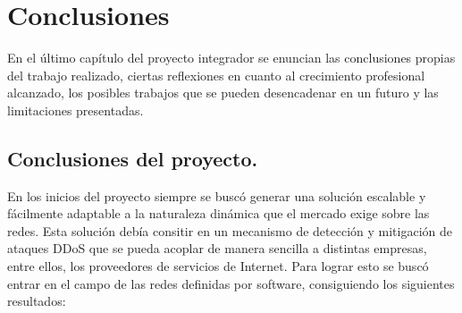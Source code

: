 \chapter{Conclusiones} %

\label{sec:Conclusiones} %

En el último capítulo del proyecto integrador se enuncian las conclusiones propias del trabajo realizado, ciertas reflexiones en cuanto al crecimiento profesional alcanzado, los posibles trabajos que se pueden desencadenar en un futuro y las limitaciones presentadas.


\section{Conclusiones del proyecto.} \label{sec:conclusionesproyecto}

En los inicios del proyecto siempre se buscó generar una solución escalable y fácilmente adaptable a la naturaleza dinámica que el mercado exige sobre las redes. Esta solución debía consitir en un mecanismo de detección y mitigación de ataques DDoS que se pueda acoplar de manera sencilla a distintas empresas, entre ellos, los proveedores de servicios de Internet. Para lograr esto se buscó entrar en el campo de las redes definidas por software, consiguiendo los siguientes resultados:

